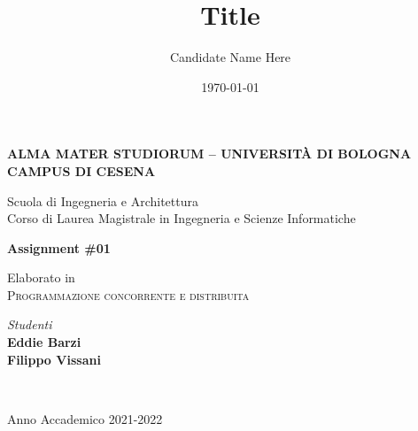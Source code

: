 \title{Title}
\author{Candidate Name Here}
\date{\today}

\begin{titlepage}
	\begin{center}
		
		\large
		\textbf{ALMA MATER STUDIORUM -- UNIVERSITÀ DI BOLOGNA \\ CAMPUS DI CESENA}
		\\
		\noindent\hrulefill
		\vspace{0.4cm}
		
		\Large
		Scuola di Ingegneria e Architettura \\
		Corso di Laurea Magistrale in Ingegneria e Scienze Informatiche
		
		\Huge
		\vspace{4cm}
		\textbf{Assignment \#01}
		
		\large
		\vspace{1cm}
		Elaborato in 
		\\
		\textsc{Programmazione concorrente e distribuita}
		
		\vspace{5.5cm}
		\begin{minipage}[t]{0.64\textwidth}
			\begin{flushleft}
			\end{flushleft}
		\end{minipage}
		\begin{minipage}[t]{0.34\textwidth}
			\begin{flushright}
				\textit{Studenti} 
				\\ 
				\textbf{Eddie Barzi}
				\\ 
				\textbf{Filippo Vissani}
			\end{flushright}
		\end{minipage}\\
		
		\vfill
		\noindent\hrulefill
		\vspace{0.3cm}
		\Large

		Anno Accademico 2021-2022
	\end{center}
\end{titlepage}
\restoregeometry
